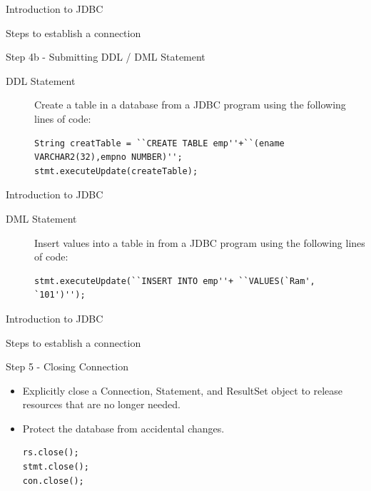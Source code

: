 \documentclass[14pt]{beamer}
\begin{document}
\begin{frame}[fragile]{Introduction to JDBC}
\begin{block}{}
Steps to establish a connection 
\end{block}
\begin{block}{}
Step 4b - Submitting DDL / DML Statement
\end{block}
\begin{description}
\item [DDL Statement] Create a table in a database from a JDBC program using the following lines of code:
\begin{lstlisting}[numbers=none]
String creatTable = ``CREATE TABLE emp''+``(ename VARCHAR2(32),empno NUMBER)'';
stmt.executeUpdate(createTable);
\end{lstlisting}
\end{description}
\end{frame}

\begin{frame}[fragile]{Introduction to JDBC}
\begin{description}
\item [DML Statement] Insert values into a table in from a JDBC program using the following lines of code:
\begin{lstlisting}[numbers=none]
stmt.executeUpdate(``INSERT INTO emp''+ ``VALUES(`Ram', `101')'');
\end{lstlisting}
\end{description}
\end{frame}


\begin{frame}[fragile]{Introduction to JDBC}
\begin{block}{}
Steps to establish a connection 
\end{block}
\begin{block}{}
Step 5 - Closing Connection
\end{block}
\begin{itemize}
\item Explicitly close a Connection, Statement, and ResultSet object to release resources that are no longer needed.
\item Protect the database from accidental changes.
\begin{lstlisting}[numbers=none]
rs.close();
stmt.close();
con.close();
\end{lstlisting}
\end{itemize}
\end{frame}
\end{document}
